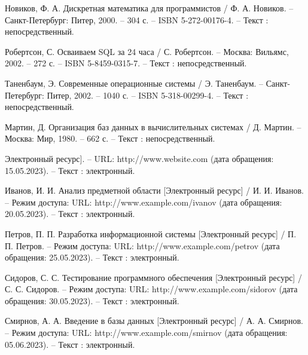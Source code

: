 \begin{thebibliography}{9}
    Новиков, Ф. А. Дискретная математика для программистов / Ф. А. Новиков. – Санкт-Петербург: Питер, 2000. – 304 с. – ISBN 5-272-00176-4. – Текст : непосредственный.
    
    Робертсон, С. Осваиваем SQL за 24 часа / С. Робертсон. – Москва: Вильямс, 2002. – 272 с. – ISBN 5-8459-0315-7. – Текст : непосредственный.
    
    Таненбаум, Э. Современные операционные системы / Э. Таненбаум. – Санкт-Петербург: Питер, 2002. – 1040 с. – ISBN 5-318-00299-4. – Текст : непосредственный.
    
    Мартин, Д. Организация баз данных в вычислительных системах / Д. Мартин. – Москва: Мир, 1980. – 662 с. – Текст : непосредственный.

    
    Электронный ресурс]. – URL: http://www.website.com (дата обращения: 15.05.2023). – Текст : электронный.
    
    Иванов, И. И. Анализ предметной области [Электронный ресурс] / И. И. Иванов. – Режим доступа: URL: http://www.example.com/ivanov (дата обращения: 20.05.2023). – Текст : электронный.
    
    Петров, П. П. Разработка информационной системы [Электронный ресурс] / П. П. Петров. – Режим доступа: URL: http://www.example.com/petrov (дата обращения: 25.05.2023). – Текст : электронный.
    
    Сидоров, С. С. Тестирование программного обеспечения [Электронный ресурс] / С. С. Сидоров. – Режим доступа: URL: http://www.example.com/sidorov (дата обращения: 30.05.2023). – Текст : электронный.
    
    Смирнов, А. А. Введение в базы данных [Электронный ресурс] / А. А. Смирнов. – Режим доступа: URL: http://www.example.com/smirnov (дата обращения: 05.06.2023). – Текст : электронный.
\end{thebibliography}
